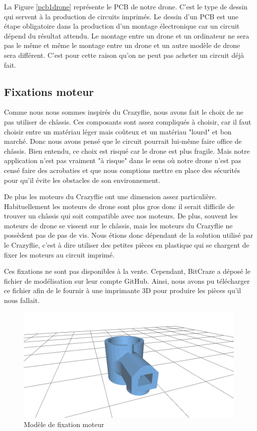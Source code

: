\documentclass[a4paper,10pt]{report}
\begin{document}
      La Figure \ref{pcb1drone} représente le PCB de notre drone. C'est le type 
de dessin qui servent à la production de circuits imprimés. Le dessin d'un PCB 
est une étape obligatoire dans la production d'un montage électronique car un 
circuit dépend du résultat attendu. Le montage entre un drone et un ordinateur 
ne sera pas le même et même le montage entre un drone et un autre modèle de 
drone sera différent. C'est pour cette raison qu'on ne peut pas acheter un 
circuit déjà fait.
      
      \subsection{Fixations moteur}
	Comme nous nous sommes inspirés du Crazyflie, nous avons fait le choix 
de ne pas utiliser de châssis. Ces composants sont assez compliqués à choisir, 
car il faut choisir entre un matériau léger mais coûteux et un matériau "lourd" 
et bon marché. Donc nous avons pensé que le circuit pourrait lui-même faire 
office de châssis. Bien entendu, ce choix est risqué car le drone est plus 
fragile. Mais notre application n'est pas vraiment "à risque" dans le sens où 
notre drone n'est pas censé faire des acrobaties et que nous comptions mettre 
en place des sécurités pour qu'il évite les obstacles de son environnement.

	De plus les moteurs du Crazyflie ont une dimension assez particulière. 
Habituellement les moteurs de drone sont plus gros donc il serait difficile de 
trouver un châssis qui soit compatible avec nos moteurs. De plus, souvent les 
moteurs de drone se vissent sur le châssis, mais les moteurs du Crazyflie ne 
possèdent pas de pas de vis. Nous étions donc dépendant de la solution utilisé 
par le Crazyflie, c'est à dire utiliser des petites pièces en plastique qui se 
chargent de fixer les moteurs au circuit imprimé.

	Ces fixations ne sont pas disponibles à la vente. Cependant, BitCraze a 
déposé le fichier de modélisation sur leur compte GitHub\cite{gitbit}. Ainsi, 
nous avons pu télécharger ce fichier afin de le fournir à une imprimante 3D 
pour produire les pièces qu'il nous fallait.

      \begin{figure}[htbp]%
	\centering
	\includegraphics[scale = 0.4]{img/model_fixation.png}
	\caption{Modèle de fixation moteur}
	\label{fixationmodel}
      \end{figure}
      
\end{document}
